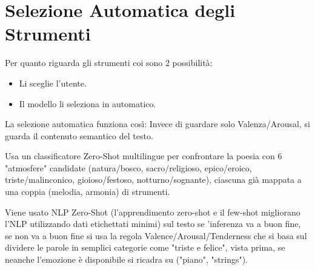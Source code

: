 \section{Selezione Automatica degli Strumenti}
Per quanto riguarda gli strumenti coi sono 2 possibilità:
\begin{itemize}
    \item Li sceglie l'utente.
    \item Il modello li seleziona in automatico.
\end{itemize}
La selezione automatica funziona così: Invece di guardare solo Valenza/Arousal, si guarda il contenuto semantico del testo.

Usa un classificatore Zero-Shot multilingue per confrontare la poesia con 6 "atmosfere" candidate (natura/bosco, sacro/religioso, epico/eroico, triste/malinconico, gioioso/festoso, notturno/sognante), ciascuna già mappata a una coppia (melodia, armonia) di strumenti.

Viene usato NLP Zero-Shot (l'apprendimento zero-shot e il few-shot migliorano l'NLP utilizzando dati etichettati minimi) sul testo se 'inferenza va a buon fine, se non va a buon fine si usa la regola Valence/Arousal/Tenderness che si basa sul dividere le parole in semplici categorie come "triste e felice", vista prima, se neanche l'emozione è disponibile si ricadra su ("piano", "strings").

